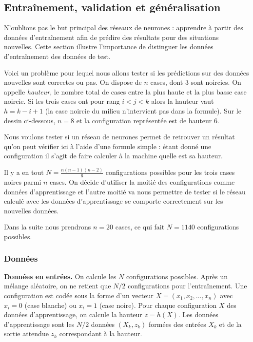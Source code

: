 \subsection{Entraînement, validation et généralisation}

N'oublions pas le but principal des réseaux de neurones : apprendre à partir des données d'entraînement afin de prédire des résultats pour des situations nouvelles. Cette section illustre l'importance de distinguer les données d'entraînement des données de test.


Voici un problème pour lequel nous allons tester si les prédictions sur des données nouvelles sont correctes ou pas.
On dispose de $n$ cases, dont $3$ sont noircies.  On appelle \emph{hauteur}, le nombre total de cases entre la plus haute et la plus basse case noircie. Si les trois cases ont pour rang $i < j <k$ alors la hauteur vaut $h = k-i+1$ (la case noircie du milieu n'intervient pas dans la formule).
Sur le dessin ci-dessous, $n=8$ et la configuration représentée est de hauteur $6$.


Nous voulons tester si un réseau de neurones permet de retrouver un résultat qu'on peut vérifier ici à l'aide d'une formule simple :
étant donné une configuration il s'agit de faire calculer à la machine quelle est sa hauteur. 

Il y a en tout $N = \frac{n(n-1)(n-2)}{6}$ configurations possibles pour les trois cases noires parmi $n$ cases.
On décide d'utiliser la moitié des configurations comme données d'apprentissage et l'autre moitié va nous permettre de tester si le réseau calculé avec les données d'apprentissage se comporte \og{}correctement\fg{} sur les nouvelles données.

Dans la suite nous prendrons $n=20$ cases, ce qui fait $N=1140$ configurations possibles.

\subsubsection*{Données}

\textbf{Données en entrées.}
On calcule les $N$ configurations possibles. Après un mélange aléatoire, on ne retient que $N/2$ configurations pour l'entraînement. Une configuration est codée sous la forme d'un vecteur
$X = (x_1,x_2,\ldots,x_n)$ avec $x_i=0$ (case blanche) ou $x_i = 1$ (case noire).
Pour chaque configuration $X$ des données d'apprentissage, on calcule la hauteur $z = h(X)$. Les données d'apprentissage sont les $N/2$ données $(X_k,z_k)$ formées des entrées $X_k$ et de la sortie attendue $z_k$ correspondant à la hauteur. 


